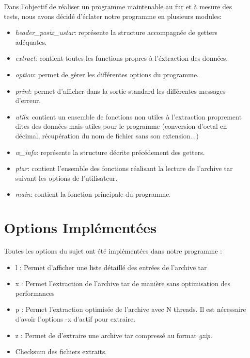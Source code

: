 \documentclass[a4paper,11pt, oneside]{book}
\begin{document}
	\noindent Dans l'objectif de réaliser un programme maintenable au fur et à mesure des tests, nous avons décidé d'éclater notre programme en plusieurs modules:
	\begin{itemize}
		\item \textit{header\_posix\_ustar}: représente la structure accompagnée de getters adéquates.
		\item \textit{extract}: contient toutes les functions propres à l'éxtraction des données.
		\item \textit{option}: permet de gérer les différentes options du programme.
		\item \textit{print}: permet d'afficher dans la sortie standard les différentes messages d'erreur.
		\item \textit{utils}: contient un ensemble de fonctions non utiles à l'extraction proprement dites des données mais utiles pour le programme (conversion d'octal en décimal, récupération du nom de fichier sans son extension...)
		\item \textit{w\_info}: représente la structure décrite précédement des getters.
		\item \textit{ptar}: contient l'ensemble des fonctions réalisant la lecture de l'archive tar suivant les options
		de l'utilisateur.
		\item \textit{main}: contient la fonction principale du programme.
	\end{itemize}


\section*{Options Implémentées}
	Toutes les options du sujet ont été implémentées dans notre programme :
	\begin{itemize}
	    \item{l : Permet d'afficher une liste détaillé des entrées de l'archive tar}
	    \item{x : Permet l'extraction de l'archive tar de manière sans optimisation des performances}
	    \item{p : Permet l'extraction optimisée de l'archive avec N threads. Il est nécessaire d'avoir l'options -x d'actif pour extraire.}
	    \item{z : Permet de d'extraire une archive tar compressé au format \textit{gzip}.}
	    \item{Checksum des fichiers extraits.}\\
	\end{itemize}
\end{document}
